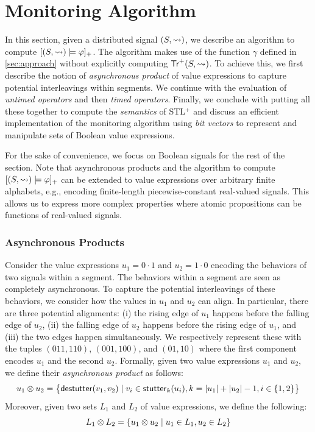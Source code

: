 \section{Monitoring Algorithm} \label{sec:algorithm}
In this section, given a distributed signal $(S,{\rightsquigarrow})$, we describe an algorithm to compute $[(S,{\rightsquigarrow}) \models \varphi]_+$.
The algorithm makes use of the function $\gamma$ defined in \cref{sec:approach} without explicitly computing $\mathsf{Tr}^+(S,{\rightsquigarrow})$.
To achieve this, we first describe the notion of \emph{asynchronous product} of value expressions to capture potential interleavings within segments.
We continue with the evaluation of \emph{untimed operators} and then \emph{timed operators}.
Finally, we conclude with putting all these together to compute the \emph{semantics} of STL$^+$ 
and discuss an efficient implementation of the monitoring algorithm using \emph{bit vectors} to 
represent and manipulate sets of Boolean value expressions.

\begin{remark}
	For the sake of convenience, we focus on Boolean signals for the rest of the section.
	Note that asynchronous products and the algorithm to compute $[(S,{\rightsquigarrow}) \models \varphi]_+$ can be extended to value expressions over arbitrary finite alphabets, e.g., encoding finite-length piecewise-constant real-valued signals.
	This allows us to express more complex properties where atomic propositions can be functions of real-valued signals.
\end{remark}

\subsubsection{Asynchronous Products}
Consider the value expressions $u_1 = 0 \cdot 1$ and $u_2 = 1 \cdot 0$ encoding the behaviors of two signals within a segment.
The behaviors within a segment are seen as completely asynchronous.
To capture the potential interleavings of these behaviors, we consider how the values in $u_1$ and $u_2$ can align.
In particular, there are three potential alignments:
(i) the rising edge of $u_1$ happens before the falling edge of $u_2$,
(ii) the falling edge of $u_2$ happens before the rising edge of $u_1$, and
(iii) the two edges happen simultaneously.
We respectively represent these with the tuples $(011, 110)$, $(001, 100)$, and $(01, 10)$ where the first component encodes $u_1$ and the second $u_2$.
Formally, given two value expressions $u_1$ and $u_2$, we define their \emph{asynchronous product} as follows:
%
\small
\[ u_1 \otimes u_2 = \big\{ \destutter(v_1, v_2) \st v_i \in \stutter_k(u_i), k = |u_1| + |u_2| - 1, i \in 
\{1,2\} \big\} \]  
\normalsize
Moreover, given two sets $L_1$ and $L_2$ of value expressions, we define the following: 
\small
\[ L_1 \otimes L_2 = \{ u_1 \otimes u_2 \st u_1 \in L_1, u_2 \in L_2 \} \]  
\normalsize

